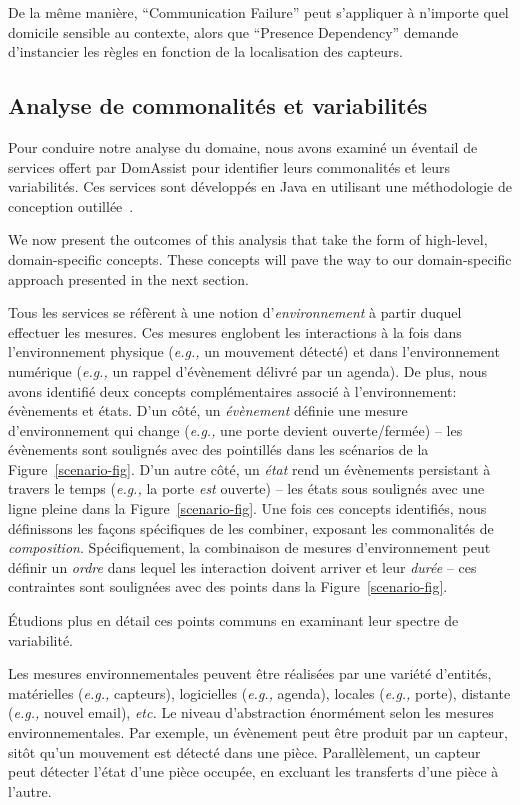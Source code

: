De la même manière, ``Communication Failure'' peut s'appliquer à n'importe quel domicile sensible au contexte, alors que ``Presence Dependency'' demande d'instancier les règles en fonction de la localisation des capteurs. 

\subsection{Analyse de commonalités et variabilités}
Pour conduire notre analyse du domaine, nous avons examiné un éventail de services offert par DomAssist pour identifier leurs commonalités et leurs variabilités. Ces services sont développés en Java en utilisant une méthodologie de conception outillée~\cite{bertran2014diasuite,cassou2012toward}.

We now present the outcomes of this analysis that take the form of high-level, domain-specific concepts. These concepts will pave the way to our domain-specific approach presented in the next section.

 Tous les services se réfèrent à une notion d'{\em environnement} à partir duquel effectuer les mesures. Ces mesures englobent les interactions à la fois dans l'environnement physique ({\em e.g.,} un mouvement détecté) et dans l'environnement numérique ({\em e.g.,} un rappel d'évènement délivré par un agenda). De plus, nous avons identifié deux concepts complémentaires associé à l'environnement: évènements et états. D'un côté, un {\em évènement} définie une mesure d'environnement qui change ({\em e.g.,} une porte devient ouverte/fermée) -- les évènements sont soulignés avec des pointillés dans les scénarios de la Figure~\ref{scenario-fig}. D'un autre côté, un {\em état} rend un évènements persistant à travers le temps ({\em e.g.,} la porte {\em est} ouverte) -- les états sous soulignés avec une ligne pleine dans la Figure~\ref{scenario-fig}. Une fois ces concepts identifiés, nous définissons les façons spécifiques de les combiner, exposant les commonalités de {\em composition}. Spécifiquement, la combinaison de mesures d'environnement peut définir un {\em ordre} dans lequel les interaction doivent arriver et leur {\em durée} -- ces contraintes sont soulignées avec des points dans la Figure~\ref{scenario-fig}.

Étudions plus en détail ces points communs en examinant leur spectre de variabilité.

 Les mesures environnementales peuvent être réalisées par une variété d'entités, matérielles ({\em e.g.,} capteurs), logicielles ({\em e.g.,} agenda), locales ({\em e.g.,} porte), distante ({\em e.g.,} nouvel email), {\em etc.} Le niveau d'abstraction énormément selon les mesures environnementales. Par exemple, un évènement peut être produit par un capteur, sitôt qu'un mouvement est détecté dans une pièce. Parallèlement, un capteur peut détecter l'état d'une pièce occupée, en excluant les transferts d'une pièce à l'autre.

